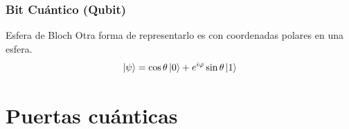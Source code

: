 \documentclass[10pt,compress]{beamer}
\begin{document}
\begin{frame}
\frametitle{Bit Cuántico (Qubit)}

\begin{block}{Esfera de Bloch}
Otra forma de representarlo es con coordenadas polares en una esfera.
\begin{equation}
\ket{\psi} = \cos \theta \ket{0} + e^{i\varphi} \sin \theta \ket{1}
\end{equation}

\end{block}

\end{frame}

\section{Puertas cuánticas}
\end{document}
